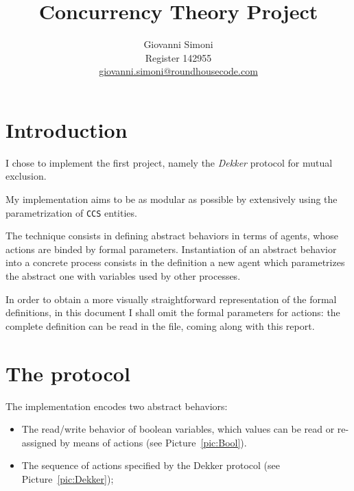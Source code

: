 \documentclass[10pt,a4paper]{article}
\title {
    Concurrency Theory Project
}
\author{
    Giovanni Simoni\\
    Register 142955\\
    \href{mailto:giovanni.simoni@roundhousecode.com}
         {giovanni.simoni@roundhousecode.com}
}
\newcommand{\CCS}{{\tt CCS}}
\newcommand{\FileName}[1]{{\sf {#1}}}
\begin{document}
\maketitle

\section{Introduction}

    I chose to implement the first project, namely the \emph{Dekker}
    protocol for mutual exclusion.

    My implementation aims to be as modular as possible by extensively
    using the parametrization of \CCS{} entities.

    The technique consists in defining abstract behaviors in terms of
    agents, whose actions are binded by formal parameters. Instantiation
    of an abstract behavior into a concrete process consists in the
    definition a new agent which parametrizes the abstract one with
    variables used by other processes.

    In order to obtain a more visually straightforward representation of
    the formal definitions, in this document I shall omit the formal
    parameters for actions: the complete definition can be read in the
    \FileName{dekker.ccs} file, coming along with this report.

\section{The protocol}

    The implementation encodes two abstract behaviors:

    \begin{itemize}

    \item   The read/write behavior of boolean variables, which values can
            be read or re-assigned by means of actions (see
            Picture~\ref{pic:Bool}).

    \item   The sequence of actions specified by the Dekker
            protocol (see Picture~\ref{pic:Dekker});

    \end{itemize}
\end{document}
